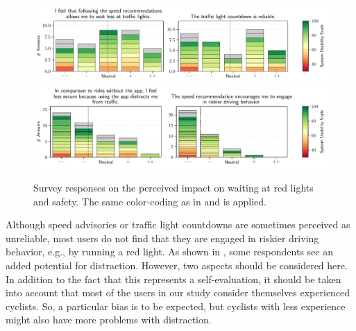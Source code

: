 \begin{figure}[t]
\caption{Survey responses on the perceived impact on waiting at red lights and safety. The same color-coding as in  and  is applied.}\label{fig:waiting-time-at-traffic-lights}
\includegraphics[width=\linewidth]{images/app-usability-questions-waiting-time-at-traffic-lights.pdf} 
\\
\includegraphics[width=\linewidth]{images/app-usability-questions-app-impact-on-safety.pdf}
\end{figure}

Although speed advisories or traffic light countdowns are sometimes perceived as unreliable, most users do not find that they are engaged in riskier driving behavior, e.g., by running a red light. As shown in , some respondents see an added potential for distraction. However, two aspects should be considered here. In addition to the fact that this represents a self-evaluation, it should be taken into account that most of the users in our study consider themselves experienced cyclists. So, a particular bias is to be expected, but cyclists with less experience might also have more problems with distraction.

